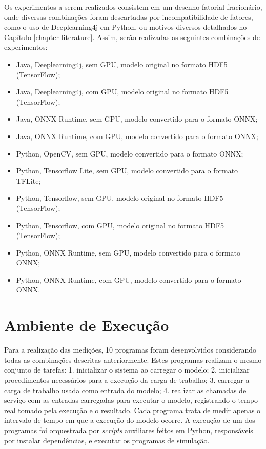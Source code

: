Os experimentos a serem realizados consistem em um desenho fatorial fracionário, onde diversas combinações foram descartadas por incompatibilidade de fatores, como o uso de Deeplearning4j em Python, ou motivos diversos detalhados no Capítulo \ref{chapter-literature}. Assim, serão realizadas as seguintes combinações de experimentos:

\begin{itemize}
    \item Java, Deeplearning4j, sem GPU, modelo original no formato HDF5 (TensorFlow);
    \item Java, Deeplearning4j, com GPU, modelo original no formato HDF5 (TensorFlow);
    \item Java, ONNX Runtime, sem GPU, modelo convertido para o formato ONNX;
    \item Java, ONNX Runtime, com GPU, modelo convertido para o formato ONNX;
    \item Python, OpenCV, sem GPU, modelo convertido para o formato ONNX;
    \item Python, Tensorflow Lite, sem GPU, modelo convertido para o formato TFLite;
    \item Python, Tensorflow, sem GPU, modelo original no formato HDF5 (TensorFlow);
    \item Python, Tensorflow, com GPU, modelo original no formato HDF5 (TensorFlow);
    \item Python, ONNX Runtime, sem GPU, modelo convertido para o formato ONNX;
    \item Python, ONNX Runtime, com GPU, modelo convertido para o formato ONNX.
\end{itemize}

\section{Ambiente de Execução}

Para a realização das medições, 10 programas foram desenvolvidos considerando todas as combinações descritas anteriormente. Estes programas realizam o mesmo conjunto de tarefas: 1. inicializar o sistema ao carregar o modelo; 2. inicializar procedimentos necessários para a execução da carga de trabalho; 3. carregar a carga de trabalho usada como entrada do modelo; 4. realizar as chamadas de serviço com as entradas carregadas para executar o modelo, registrando o tempo real tomado pela execução e o resultado. Cada programa trata de medir apenas o intervalo de tempo em que a execução do modelo ocorre. A execução de um dos programas foi orquestrada por \textit{scripts} auxiliares feitos em Python, responsáveis por instalar dependências, e executar os programas de simulação.

